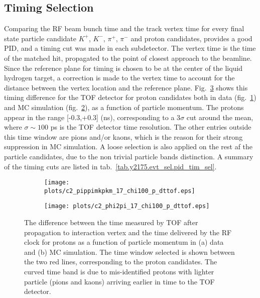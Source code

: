 \subsection{Timing Selection}
\label{chap.y2175.evt_sel.pid_tim_sel}

Comparing the RF beam bunch time and the track vertex time for every final state particle candidate $K^{+}$, $K^{-}$, $\pi^{+}$, $\pi^{-}$ and proton candidates, provides a good PID, and a timing cut was made in each subdetector. The vertex time is the time of the matched hit, propagated to the point of closest approach to the beamline. Since the reference plane for timing is chosen to be at the center of the liquid hydrogen target, a correction is made to the vertex time to account for the distance between the vertex location and the reference plane. Fig.~\ref{fig.y2175.evt_sel.pid_tim_sel} shows this timing difference for the TOF detector for proton candidates both in data (fig.~\ref{fig.y2175.evt_sel.pid_tim_sel.a}) and MC simulation (fig.~\ref{fig.y2175.evt_sel.pid_tim_sel.b}), as a function of particle momentum. The protons appear in the range [-0.3,+0.3] (ns), corresponding to a 3$\sigma$ cut around the mean, where $\sigma \sim 100$ ps is the TOF detector time resolution. The other entries outside this time window are pions and/or kaons, which is the reason for their strong suppression in MC simulation. A loose selection is also applied on the rest af the particle candidates, due to the non trivial particle bands distinction. A summary of the timing cuts are listed in tab.~\ref{tab.y2175.evt_sel.pid_tim_sel}.

\begin{figure}[H]
    \centering
    \begin{subfigure}[b]{0.5\textwidth}
        \texttt{[image: plots/c2\_pippimkpkm\_17\_chi100\_p\_dttof.eps]}
        \caption{}
        \label{fig.y2175.evt_sel.pid_tim_sel.a}
    \end{subfigure}\hfill
    \begin{subfigure}[b]{0.5\textwidth}
        \texttt{[image: plots/c2\_phi2pi\_17\_chi100\_p\_dttof.eps]}
        \caption{}
        \label{fig.y2175.evt_sel.pid_tim_sel.b}
    \end{subfigure}
    \caption{The difference between the time measured by TOF after propagation to interaction vertex and the time delivered by the RF clock for protons as a function of particle momentum in (a) data and (b) MC simulation. The time window selected is shown between the two red lines, corresponding to the proton candidates. The curved time band is due to mis-identified protons with lighter particle (pions and kaons) arriving earlier in time to the TOF detector.}
    \label{fig.y2175.evt_sel.pid_tim_sel}
\end{figure}

